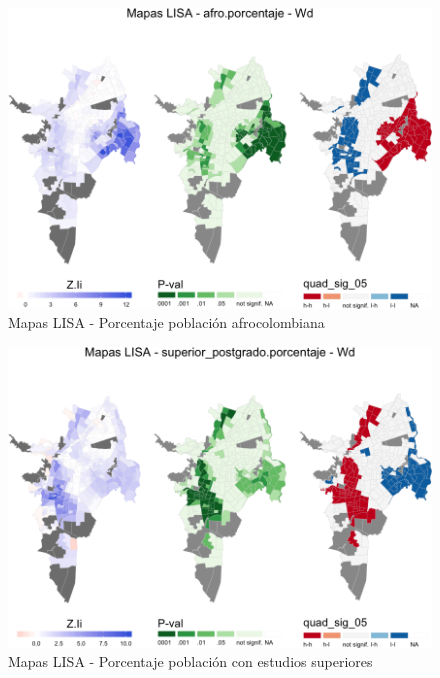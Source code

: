 \documentclass[12pt,a4paper,openany]{book}
\theoremstyle{definition}
\theoremstyle{definition}
\theoremstyle{definition}
\theoremstyle{remark}
\begin{document}
\begin{figure}[H]

{\centering \includegraphics[width=1\linewidth]{tesis-unigis_files/figure-latex/lisa-afro-1} 

}

\caption{Mapas LISA - Porcentaje población afrocolombiana}\label{fig:lisa-afro}
\end{figure}

\begin{figure}[H]

{\centering \includegraphics[width=1\linewidth]{tesis-unigis_files/figure-latex/lisa-superiores-1} 

}

\caption{Mapas LISA - Porcentaje población con estudios superiores}\label{fig:lisa-superiores}
\end{figure}
\end{document}
